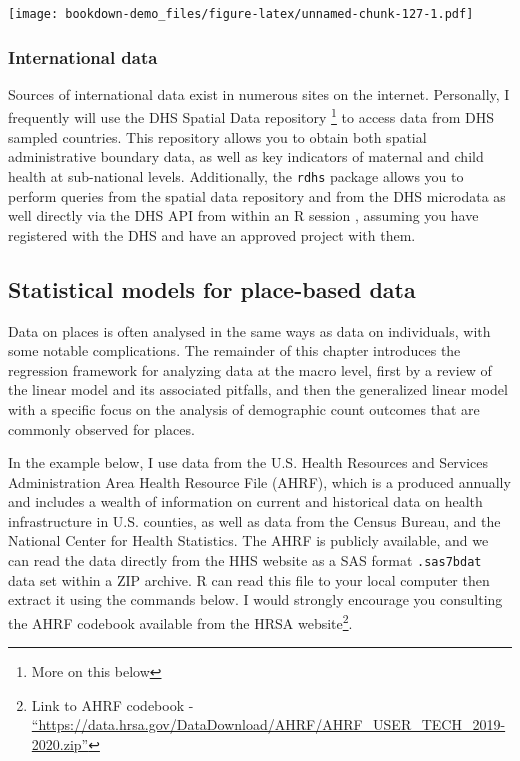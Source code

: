\documentclass[
]{article}
\begin{document}
\texttt{[image: bookdown-demo\_files/figure-latex/unnamed-chunk-127-1.pdf]}

\hypertarget{international-data}{%
\subsubsection{International data}\label{international-data}}

Sources of international data exist in numerous sites on the internet. Personally, I frequently will use the DHS Spatial Data repository \footnote{More on this below} to access data from DHS sampled countries. This repository allows you to obtain both spatial administrative boundary data, as well as key indicators of maternal and child health at sub-national levels. Additionally, the \texttt{rdhs} package allows you to perform queries from the spatial data repository and from the DHS microdata as well directly via the DHS API from within an R session \citep{rdhs}, assuming you have registered with the DHS and have an approved project with them.

\hypertarget{statistical-models-for-place-based-data}{%
\subsection{Statistical models for place-based data}\label{statistical-models-for-place-based-data}}

Data on places is often analysed in the same ways as data on individuals, with some notable complications. The remainder of this chapter introduces the regression framework for analyzing data at the macro level, first by a review of the linear model and its associated pitfalls, and then the generalized linear model with a specific focus on the analysis of demographic count outcomes that are commonly observed for places.

In the example below, I use data from the U.S. Health Resources and Services Administration Area Health Resource File (AHRF), which is a produced annually and includes a wealth of information on current and historical data on health infrastructure in U.S. counties, as well as data from the Census Bureau, and the National Center for Health Statistics. The AHRF is publicly available, and we can read the data directly from the HHS website as a SAS format \texttt{.sas7bdat} data set within a ZIP archive. R can read this file to your local computer then extract it using the commands below. I would strongly encourage you consulting the AHRF codebook available from the HRSA website\footnote{Link to AHRF codebook - \href{https://data.hrsa.gov/DataDownload/AHRF/AHRF_USER_TECH_2019-2020.zip}{``https://data.hrsa.gov/DataDownload/AHRF/AHRF\_USER\_TECH\_2019-2020.zip''}}.
\end{document}
